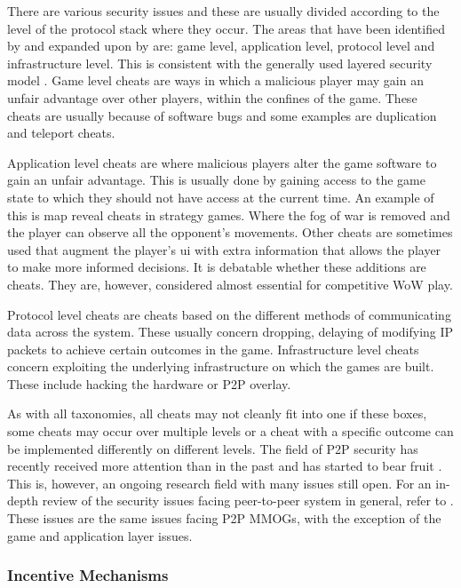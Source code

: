 \documentclass[journal,oneside,a4paper,onecolumn]{IEEEtran}
\begin{document}
There are various security issues and these are usually divided according to the level of the protocol stack where they occur. The areas that have been identified by \cite{cheat_proof_event_ordering} and expanded upon by \cite{cheating_taxonomy} are: game level, application level, protocol level and infrastructure level. This is consistent with the generally used layered security model \cite{distributed_systems_security}. Game level cheats are ways in which a malicious player may gain an unfair advantage over other players, within the confines of the game. These cheats are usually because of software bugs and some examples are duplication and teleport cheats.

Application level cheats are where malicious players alter the game software to gain an unfair advantage. This is usually done by gaining access to the game state to which they should not have access at the current time. An example of this is map reveal cheats in strategy games. Where the fog of war is removed and the player can observe all the opponent's movements. Other cheats are sometimes used that augment the player's \ac{ui} with extra information that allows the player to make more informed decisions. It is debatable whether these additions are cheats. They are, however, considered almost essential for competitive \ac{WoW} play.

Protocol level cheats are cheats based on the different methods of communicating data across the system. These usually concern dropping, delaying of modifying IP packets to achieve certain outcomes in the game. Infrastructure level cheats concern exploiting the underlying infrastructure on which the games are built. These include hacking the hardware or P2P overlay.

As with all taxonomies, all cheats may not cleanly fit into one if these boxes, some cheats may occur over multiple levels or a cheat with a specific outcome can be implemented differently on different levels. The field of P2P security has recently received more attention than in the past and has started to bear fruit \cite{survey_p2p_game_cheats}. This is, however, an ongoing research field with many issues still open. For an in-depth review of the security issues facing peer-to-peer system in general, refer to \cite{p2p_security_issues}. These issues are the same issues facing P2P MMOGs, with the exception of the game and application layer issues.

\subsubsection{Incentive Mechanisms}
\end{document}
